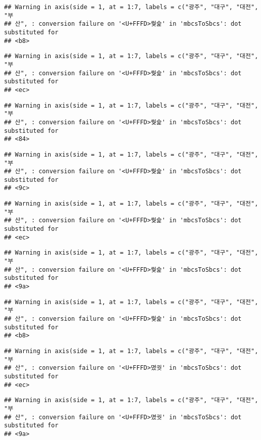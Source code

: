 \documentclass[]{article}
\begin{document}
\begin{verbatim}
## Warning in axis(side = 1, at = 1:7, labels = c("광주", "대구", "대전", "부
## 산", : conversion failure on '<U+FFFD>쒖슱' in 'mbcsToSbcs': dot substituted for
## <b8>
\end{verbatim}

\begin{verbatim}
## Warning in axis(side = 1, at = 1:7, labels = c("광주", "대구", "대전", "부
## 산", : conversion failure on '<U+FFFD>쒖슱' in 'mbcsToSbcs': dot substituted for
## <ec>
\end{verbatim}

\begin{verbatim}
## Warning in axis(side = 1, at = 1:7, labels = c("광주", "대구", "대전", "부
## 산", : conversion failure on '<U+FFFD>쒖슱' in 'mbcsToSbcs': dot substituted for
## <84>
\end{verbatim}

\begin{verbatim}
## Warning in axis(side = 1, at = 1:7, labels = c("광주", "대구", "대전", "부
## 산", : conversion failure on '<U+FFFD>쒖슱' in 'mbcsToSbcs': dot substituted for
## <9c>
\end{verbatim}

\begin{verbatim}
## Warning in axis(side = 1, at = 1:7, labels = c("광주", "대구", "대전", "부
## 산", : conversion failure on '<U+FFFD>쒖슱' in 'mbcsToSbcs': dot substituted for
## <ec>
\end{verbatim}

\begin{verbatim}
## Warning in axis(side = 1, at = 1:7, labels = c("광주", "대구", "대전", "부
## 산", : conversion failure on '<U+FFFD>쒖슱' in 'mbcsToSbcs': dot substituted for
## <9a>
\end{verbatim}

\begin{verbatim}
## Warning in axis(side = 1, at = 1:7, labels = c("광주", "대구", "대전", "부
## 산", : conversion failure on '<U+FFFD>쒖슱' in 'mbcsToSbcs': dot substituted for
## <b8>
\end{verbatim}

\begin{verbatim}
## Warning in axis(side = 1, at = 1:7, labels = c("광주", "대구", "대전", "부
## 산", : conversion failure on '<U+FFFD>몄궛' in 'mbcsToSbcs': dot substituted for
## <ec>
\end{verbatim}

\begin{verbatim}
## Warning in axis(side = 1, at = 1:7, labels = c("광주", "대구", "대전", "부
## 산", : conversion failure on '<U+FFFD>몄궛' in 'mbcsToSbcs': dot substituted for
## <9a>
\end{verbatim}
\end{document}
